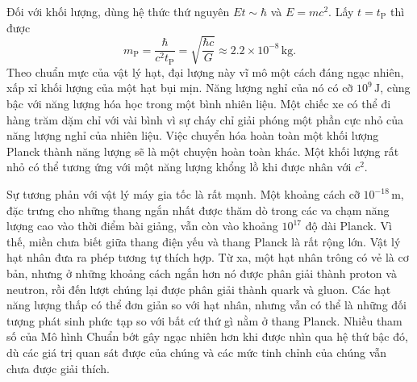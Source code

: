 Đối với khối lượng, dùng hệ thức thứ nguyên \(Et\sim\hbar\) và \(E=mc^2\). Lấy \(t=t_{\mathrm P}\) thì được
\begin{equation}
m_{\mathrm P}
=\frac{\hbar}{c^2t_{\mathrm P}}
=\sqrt{\frac{\hbar c}{G}}
\approx 2.2\times10^{-8}\,\mathrm{kg}.
\label{eq:c10-planck-mass}
\end{equation}
Theo chuẩn mực của vật lý hạt, đại lượng này vĩ mô một cách đáng ngạc nhiên, xấp xỉ khối lượng của một hạt bụi mịn. Năng lượng nghỉ của nó có cỡ \(10^9\,\mathrm J\), cùng bậc với năng lượng hóa học trong một bình nhiên liệu. Một chiếc xe có thể đi hàng trăm dặm chỉ với vài bình vì sự cháy chỉ giải phóng một phần cực nhỏ của năng lượng nghỉ của nhiên liệu. Việc chuyển hóa hoàn toàn một khối lượng Planck thành năng lượng sẽ là một chuyện hoàn toàn khác. Một khối lượng rất nhỏ có thể tương ứng với một năng lượng khổng lồ khi được nhân với \(c^2\).

Sự tương phản với vật lý máy gia tốc là rất mạnh. Một khoảng cách cỡ \(10^{-18}\,\mathrm m\), đặc trưng cho những thang ngắn nhất được thăm dò trong các va chạm năng lượng cao vào thời điểm bài giảng, vẫn còn vào khoảng \(10^{17}\) độ dài Planck. Vì thế, miền chưa biết giữa thang điện yếu và thang Planck là rất rộng lớn. Vật lý hạt nhân đưa ra phép tương tự thích hợp. Từ xa, một hạt nhân trông có vẻ là cơ bản, nhưng ở những khoảng cách ngắn hơn nó được phân giải thành proton và neutron, rồi đến lượt chúng lại được phân giải thành quark và gluon. Các hạt năng lượng thấp có thể đơn giản so với hạt nhân, nhưng vẫn có thể là những đối tượng phát sinh phức tạp so với bất cứ thứ gì nằm ở thang Planck. Nhiều tham số của Mô hình Chuẩn bớt gây ngạc nhiên hơn khi được nhìn qua hệ thứ bậc đó, dù các giá trị quan sát được của chúng và các mức tinh chỉnh của chúng vẫn chưa được giải thích.

\begin{classroomqa}
\end{classroomqa}

